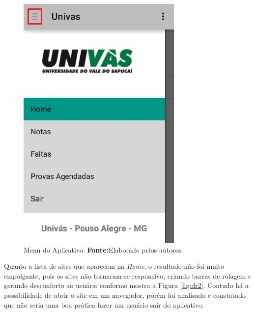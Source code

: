 \begin{figure}[h!]
	\centerline{\includegraphics[scale=0.5]{./imagens/3_discussao_resultados/dr1.png}}
	\caption[Menu do Aplicativo]{Menu do Aplicativo.
		\textbf{Fonte:}Elaborado pelos autores.}
	\label{fig:dr1}
\end{figure}
\pagebreak

	\par Quanto a lista de sites que aparecem na \textit{Home}, o resultado não foi
muito empolgante, pois os sites não tornaram-se responsivo, criando barras de
rolagem e gerando desconforto ao usuário conforme mostra a Figura
\ref{fig:dr2}. Contudo há a possibilidade de abrir o site em um navegador,
porém foi analisado e constatado que não seria uma boa prática fazer um usuário
sair do aplicativo.

